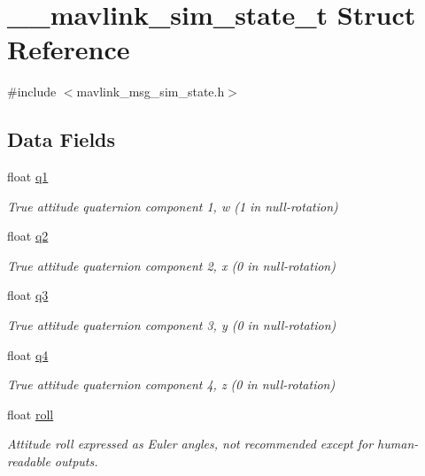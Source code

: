 \hypertarget{struct____mavlink__sim__state__t}{\section{\+\_\+\+\_\+mavlink\+\_\+sim\+\_\+state\+\_\+t Struct Reference}
\label{struct____mavlink__sim__state__t}
}


{\ttfamily \#include $<$mavlink\+\_\+msg\+\_\+sim\+\_\+state.\+h$>$}

\subsection*{Data Fields}
\begin{DoxyCompactItemize}
\item 
float \hyperlink{struct____mavlink__sim__state__t_a9dfbea689e2c7698c3a261f6802c8e1f}{q1}
\begin{DoxyCompactList}\small\item\em True attitude quaternion component 1, w (1 in null-\/rotation) \end{DoxyCompactList}\item 
float \hyperlink{struct____mavlink__sim__state__t_a1505c15afe799f4f900ad53c8d55b40c}{q2}
\begin{DoxyCompactList}\small\item\em True attitude quaternion component 2, x (0 in null-\/rotation) \end{DoxyCompactList}\item 
float \hyperlink{struct____mavlink__sim__state__t_a6b8cee23b1ef3cdbd9b501d7288b9a7c}{q3}
\begin{DoxyCompactList}\small\item\em True attitude quaternion component 3, y (0 in null-\/rotation) \end{DoxyCompactList}\item 
float \hyperlink{struct____mavlink__sim__state__t_ae16cb79acbe95c51bb3a341d0d2ffda1}{q4}
\begin{DoxyCompactList}\small\item\em True attitude quaternion component 4, z (0 in null-\/rotation) \end{DoxyCompactList}\item 
float \hyperlink{struct____mavlink__sim__state__t_a58165fc0ced95f3db6546a9ccacf1705}{roll}
\begin{DoxyCompactList}\small\item\em Attitude roll expressed as Euler angles, not recommended except for human-\/readable outputs. \end{DoxyCompactList}\item 

\end{DoxyCompactItemize}
